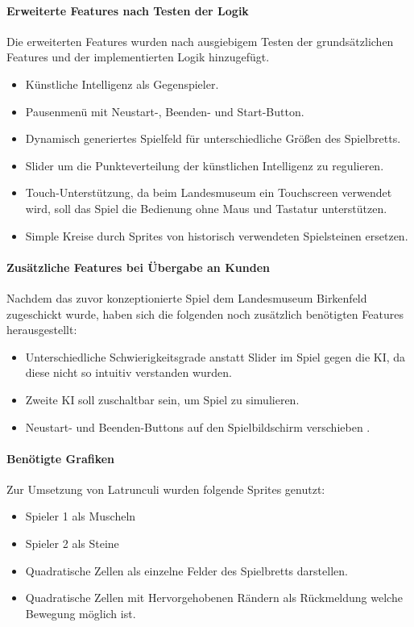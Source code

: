  \paragraph{Erweiterte Features nach Testen der Logik}
 Die erweiterten Features wurden nach ausgiebigem Testen der grundsätzlichen Features und der implementierten Logik hinzugefügt.
 \begin{itemize}
 \item Künstliche Intelligenz als Gegenspieler.
 \item Pausenmenü mit Neustart-, Beenden- und Start-Button.
 \item Dynamisch generiertes Spielfeld für unterschiedliche Größen des Spielbretts.
 \item Slider um die Punkteverteilung der künstlichen Intelligenz zu regulieren.
 \item Touch-Unterstützung, da beim Landesmuseum ein Touchscreen verwendet wird, soll das Spiel die Bedienung ohne Maus und Tastatur unterstützen.
 \item Simple Kreise durch Sprites von historisch verwendeten Spielsteinen ersetzen.
\end{itemize}


\paragraph{Zusätzliche Features bei Übergabe an Kunden}
Nachdem das zuvor konzeptionierte Spiel dem Landesmuseum Birkenfeld zugeschickt wurde, haben sich die folgenden noch zusätzlich benötigten Features herausgestellt:
\begin{itemize}
	\item Unterschiedliche Schwierigkeitsgrade anstatt Slider im Spiel gegen die KI, da diese nicht so intuitiv verstanden wurden.
	\item Zweite KI soll zuschaltbar sein, um Spiel zu simulieren.
	\item Neustart- und Beenden-Buttons auf den Spielbildschirm verschieben	.
\end{itemize}


\paragraph{Benötigte Grafiken}
Zur Umsetzung von Latrunculi wurden folgende Sprites genutzt:
\begin{itemize}
	\item Spieler 1 als Muscheln
	\item Spieler 2 als Steine
	\item Quadratische Zellen als einzelne Felder des Spielbretts darstellen.
	\item Quadratische Zellen mit Hervorgehobenen Rändern als Rückmeldung welche Bewegung möglich ist.
\end{itemize}

